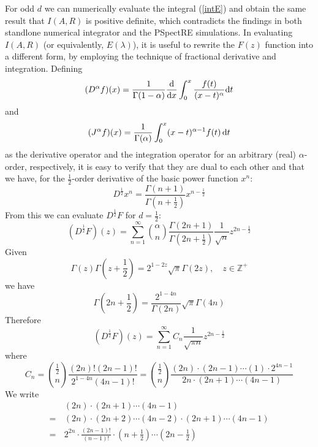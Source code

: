 \documentclass{report}
\begin{document}
For odd $d$ we can numerically evaluate the integral (\ref{intE}) and obtain the same result that $I(A,R)$ is positive definite, which contradicts the findings in both standlone numerical integrator and the PSpectRE simulations. In evaluating $I(A,R)$ (or equivalently, $E(\lambda)$), it is useful to rewrite the $F(z)$ function into a different form, by employing the technique of fractional derivative and integration. Defining
\begin{equation}
  (D^\alpha f)(x)= \frac{1}{\Gamma(1-\alpha)}\frac{\rm d}{{\rm d}x}\int^x_0
  \frac{f(t)}{(x-t)^\alpha}{\rm d}t
\end{equation}
and
\begin{equation}
  (J^\alpha f)(x) = \frac{1}{\Gamma(\alpha)}\int^x_0(x-t)^{\alpha-1}f(t)\,{\rm d}t
\end{equation}
as the derivative operator and the integration operator for an arbitrary (real) $\alpha$-order, respectively, it is easy to verify that they are dual to each other and that we have, for the $\frac{1}{2}$-order derivative of the basic power function $x^n$:
\begin{equation}
  D^\frac{1}{2} x^n = \frac{\Gamma(n+1)}{\Gamma(n+\frac{1}{2})} x^{n-\frac{1}{2}}
\end{equation}
From this we can evaluate $D^\frac{1}{2} F$ for $d=\frac{1}{2}$:
\begin{equation}
  (D^\frac{1}{2} F)(z) = \sum^\infty_{n=1} \binom{\alpha}{n} \frac{\Gamma(2n+1)}{\Gamma(2n+\frac{1}{2})}\frac{1}{\sqrt{n}}z^{2n-\frac{1}{2}}
\end{equation}
Given
\begin{equation}
  \Gamma(z)\Gamma(z+\frac{1}{2})=2^{1-2z}\sqrt{\pi}\Gamma(2z),\quad z\in\mathbb{Z}^+
\end{equation}
we have
\begin{equation}
  \Gamma(2n+\frac{1}{2}) = \frac{2^{1-4n}}{\Gamma(2n)}\sqrt{\pi}\Gamma(4n)
\end{equation}
Therefore
\begin{equation}
  (D^\frac{1}{2}F)(z) = \sum^\infty_{n=1} C_n \frac{1}{\sqrt{\pi n}} z^{2n-\frac{1}{2}}
\end{equation}
where
\begin{equation}
  C_n = \binom{\frac{1}{2}}{n} \frac{(2n)!(2n-1)!}{2^{1-4n} (4n-1)!} =\binom{\frac{1}{2}}{n} \frac{(2n)\cdot(2n-1)\cdots(1)\cdot2^{4n-1}}{2n\cdot(2n+1)\cdots(4n-1)}
\end{equation}
We write
\begin{equation}
  \begin{split}
    &(2n)\cdot(2n+1)\cdots(4n-1)\\
    =\,&(2n)\cdot(2n+2)\cdots(4n-2) \cdot (2n+1)\cdots(4n-1) \\
    =\,& 2^{2n}\cdot \frac{(2n-1)!}{(n-1)!}\cdot\left(n+\frac{1}{2}\right)\cdots\left(2n-\frac{1}{2}\right)
  \end{split}
\end{equation}
\end{document}
